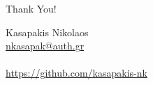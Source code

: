 \begin{frame}
    \begin{center}
        \Huge{Thank You!}
    \end{center}

    \begin{center}
        Kasapakis Nikolaos\\
        \href{mailto:nkasapak@auth.gr}{nkasapak@auth.gr}
        \\~\\
        \href{https://github.com/kasapakis-nk}{https://github.com/kasapakis-nk}\\
    \end{center}
\end{frame}
